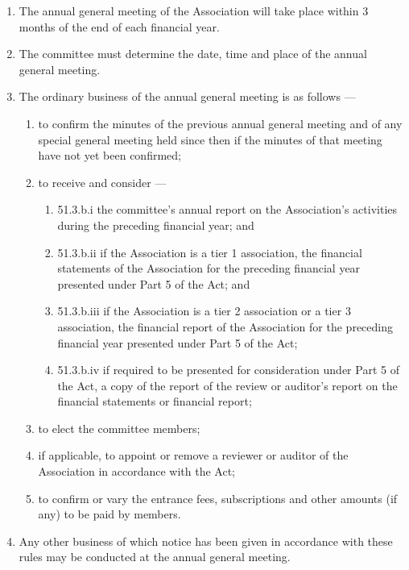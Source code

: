 \begin{enumerate}

\item The annual general meeting of the Association will take place within 3 months of the end of each financial year.
\item The committee must determine the date, time and place of the annual general meeting.
\item The ordinary business of the annual general meeting is as follows ---

  \begin{enumerate}
  
  \item to confirm the minutes of the previous annual general meeting and of any special general meeting held since then if the minutes of that meeting have not yet been confirmed;
  \item to receive and consider ---

    \begin{enumerate}
    
    \item 51.3.b.i the committee's annual report on the Association's activities during the preceding financial year; and
    \item 51.3.b.ii if the Association is a tier 1 association, the financial statements of the Association for the preceding financial year presented under Part 5 of the Act; and
    \item 51.3.b.iii if the Association is a tier 2 association or a tier 3 association, the financial report of the Association for the preceding financial year presented under Part 5 of the Act;
    \item 51.3.b.iv if required to be presented for consideration under Part 5 of the Act, a copy of the report of the review or auditor's report on the financial statements or financial report;
    \end{enumerate}
  \item to elect the committee members;
  \item if applicable, to appoint or remove a reviewer or auditor of the Association in accordance with the Act;
  \item to confirm or vary the entrance fees, subscriptions and other amounts (if any) to be paid by members.
  \end{enumerate}
\item Any other business of which notice has been given in accordance with these rules may be conducted at the annual general meeting.
\end{enumerate}

